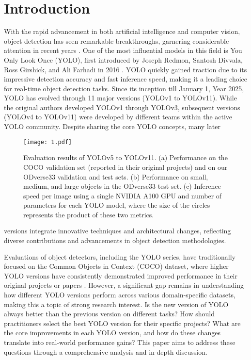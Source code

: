 \documentclass[runningheads]{llncs}
\begin{document}
\section{Introduction}



With the rapid advancement in both artificial intelligence and computer vision, object detection has seen remarkable breakthroughs, garnering considerable attention in recent years \cite{Zou2023}. One of the most influential models in this field is You Only Look Once (YOLO), first introduced by Joseph Redmon, Santosh Divvala, Ross Girshick, and Ali Farhadi in 2016 \cite{Redmon2016}. YOLO quickly gained traction due to its impressive detection accuracy and fast inference speed, making it a leading choice for real-time object detection tasks. Since its inception till January 1, Year 2025, YOLO has evolved through 11 major versions (YOLOv1 to YOLOv11). While the original authors developed YOLOv1 through YOLOv3, subsequent versions (YOLOv4 to YOLOv11) were developed by different teams within the active YOLO community. Despite sharing the core YOLO concepts, many later

\begin{figure}[H]
\centering
\texttt{[image: 1.pdf]} %
\caption{Evaluation results of YOLOv5 to YOLOv11. (a) Performance on the COCO validation set (reported in their original projects) and on our ODverse33 validation and test sets. (b) Performance on small, medium, and large objects in the ODverse33 test set. (c) Inference speed per image using a single NVIDIA A100 GPU and number of parameters for each YOLO model, where the size of the circles represents the product of these two metrics.}
\label{fig:evaluation}
\end{figure}
\noindent
versions integrate innovative techniques and architectural changes, reflecting diverse contributions and advancements in object detection methodologies.


Evaluations of object detectors, including the YOLO series, have traditionally focused on the Common Objects in Context (COCO) dataset, where higher YOLO versions have consistently demonstrated improved performance in their original projects or papers \cite{Lin2014}. However, a significant gap remains in understanding how different YOLO versions perform across various domain-specific datasets, making this a topic of strong research interest. Is the new version of YOLO always better than the previous version on different tasks? How should practitioners select the best YOLO version for their specific projects? What are the core improvements in each YOLO version, and how do these changes translate into real-world performance gains? This paper aims to address these questions through a comprehensive analysis and in-depth discussion. 
\end{document}
